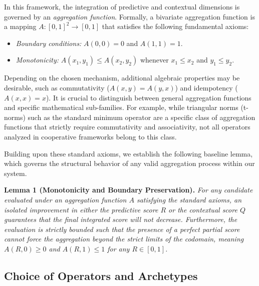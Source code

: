 \documentclass[mathematics,article,submit,moreauthors]{Definitions/mdpi}
\begin{document}
In this framework, the integration of predictive and contextual dimensions is governed by an \textit{aggregation function}. Formally, a bivariate aggregation function is a mapping $A: [0,1]^2 \to [0,1]$ that satisfies the following fundamental axioms:
\begin{itemize}
    \item \textit{Boundary conditions:} $A(0,0) = 0$ and $A(1,1) = 1$.
    \item \textit{Monotonicity:} $A(x_1, y_1) \le A(x_2, y_2)$ whenever $x_1 \le x_2$ and $y_1 \le y_2$.
\end{itemize}

Depending on the chosen mechanism, additional algebraic properties may be desirable, such as commutativity ($A(x,y) = A(y,x)$) and idempotency ($A(x,x) = x$). It is crucial to distinguish between general aggregation functions and specific mathematical sub-families. For example, while triangular norms (t-norms) such as the standard minimum operator are a specific class of aggregation functions that strictly require commutativity and associativity, not all operators analyzed in cooperative frameworks belong to this class.

Building upon these standard axioms, we establish the following baseline lemma, which governs the structural behavior of any valid aggregation process within our system.

\begin{Lemma}
    \label{lemma:monotonicity-and-boundary-preservation}
    \textbf{Lemma 1 (Monotonicity and Boundary Preservation).} \textit{For any candidate evaluated under an aggregation function $A$ satisfying the standard axioms, an isolated improvement in either the predictive score $R$ or the contextual score $Q$ guarantees that the final integrated score will not decrease. Furthermore, the evaluation is strictly bounded such that the presence of a perfect partial score cannot force the aggregation beyond the strict limits of the codomain, meaning $A(R,0) \ge 0$ and $A(R,1) \le 1$ for any $R \in [0,1]$.}
\end{Lemma}



\subsection{Choice of Operators and Archetypes}
\end{document}
